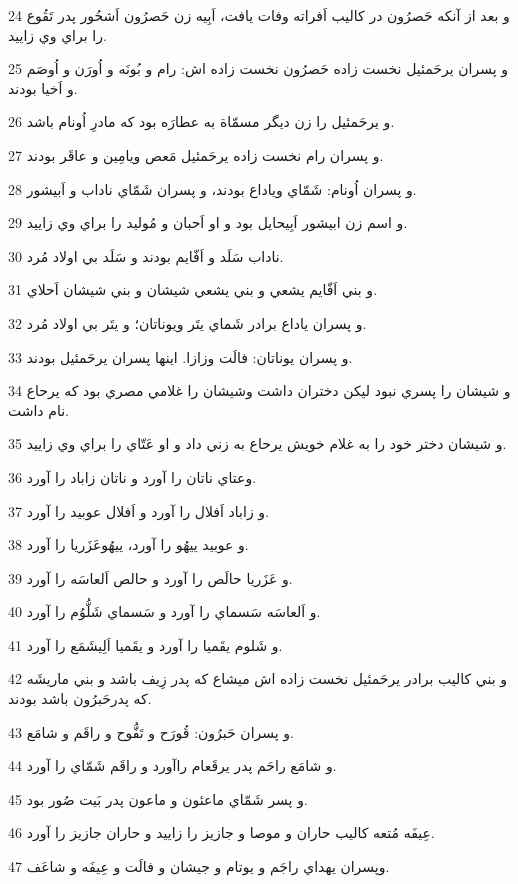 \par 24 و بعد از آنکه حَصرُون در کاليب اَفراته وفات يافت، اَبِيه زن حَصرُون اَشحُور پدر تَقُوع را براي وي زاييد.
\par 25 و پسران يرحَمئيل نخست زاده حَصرُون نخست زاده اش: رام و بُونَه و اُورَن و اُوصَم و اَخيا بودند.
\par 26 و يرحَمئيل را زن ديگر مسمّاة به عطارَه بود که مادرِ اُونام باشد.
\par 27 و پسران رام نخست زاده يرحَمئيل مَعص ويامِين و عاقَر بودند.
\par 28 و پسران اُونام: شَمّاي وياداع بودند، و پسران شَمّاي ناداب و اَبيشور.
\par 29 و اسم زن ابيشور اَبِيحايل بود و او اَحبان و مُوليد را براي وي زاييد.
\par 30 ناداب سَلَد و اَفّايم بودند و سَلَد بي اولاد مُرد.
\par 31 و بني اَفّايم يشعي و بني يشعي شيشان و بني شيشان اَحلاي.
\par 32 و پسران ياداع برادر شَماي يتَر ويوناتان؛ و يتَر بي اولاد مُرد.
\par 33 و پسران يوناتان: فالَت وزازا. اينها پسران يرحَمئيل بودند.
\par 34 و شيشان را پسري نبود ليکن دختران داشت وشيشان را غلامي مصري بود که يرحاع نام داشت.
\par 35 و شيشان دختر خود را به غلام خويش يرحاع به زني داد و او عَتّاي را براي وي زاييد.
\par 36 وعتاي ناتان را آورد و ناتان زاباد را آورد.
\par 37 و زاباد اَفلال را آورد و اَفلال عوبيد را آورد.
\par 38 و عوبيد ييهُو را آورد، ييهُوعَزَريا را آورد.
\par 39 و عَزَريا حالَص را آورد و حالص اَلعاسَه را آورد.
\par 40 و اَلعاسَه سَسماي را آورد و سَسماي شَلُّوُم را آورد.
\par 41 و شَلوم يقَميا را آورد و يقَميا اَلِيشَمَع را آورد.
\par 42 و بني کاليب برادر يرحَمئيل نخست زاده اش ميشاع که پدر زِيف باشد و بني ماريشَه که پدرحَبرُون باشد بودند.
\par 43 و پسران حَبرُون: قُورَح و تَفُّوح و راقَم و شامَع.
\par 44 و شامَع راحَم پدر يرقَعام راآورد و راقَم شَمّاي را آورد.
\par 45 و پسر شَمّاي ماعئون و ماعون پدر بَيت صُور بود.
\par 46 عِيفَه مُتعه کاليب حاران و موصا و جازيز را زاييد و حاران جازيز را آورد.
\par 47 وپسران يهداي راجَم و يوتام و جيشان و فالَت و عِيفَه و شاعَف.
